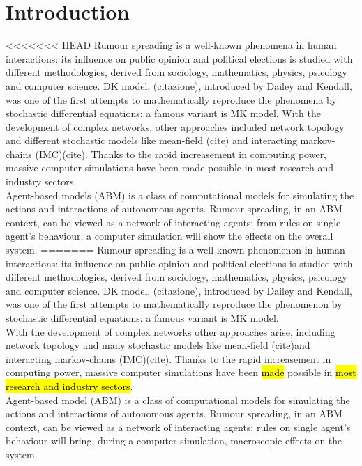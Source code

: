\section{Introduction}
<<<<<<< HEAD
Rumour spreading is a well-known phenomena in human interactions: its influence on public opinion and political elections is studied with different methodologies, derived from sociology, mathematics, physics, psicology and computer science.
DK model, (citazione), introduced by Dailey and Kendall, was one of the first attempts to mathematically reproduce the phenomena by stochastic differential equations: a famous variant is MK model.
With the development of complex networks, other approaches included network topology 
and different stochastic models like mean-field (cite) and interacting markov-chains (IMC)(cite).
Thanks to the rapid increasement in computing power, massive computer simulations have been made possible in most research and industry sectors.\\
Agent-based models (ABM) is a class of computational models for simulating the actions and interactions of autonomous agents.
Rumour spreading, in an ABM context, can be viewed as a network of interacting agents: from rules on single agent's behaviour,  a computer simulation will show the effects on the overall system.
=======
Rumour spreading is a well known phenomenon in human interactions:
its influence on public opinion and political elections is studied
with different methodologies, derived from sociology, mathematics,
physics, psicology and computer science.
DK model, (citazione), introduced by Dailey and Kendall, was one of
the first attempts to mathematically reproduce the phenomenon by
stochastic differential equations: a famous variant is MK model.\\
With the development of complex networks other approaches arise,
including network topology and many stochastic models
like mean-field (cite)and interacting markov-chains (IMC)(cite).
Thanks to the rapid increasement in computing power,
massive computer simulations have been \hl{made} possible in
\hl{most research and industry sectors}.\\
Agent-based model (ABM) is a class of computational models for
simulating the actions and interactions of autonomous agents.
Rumour spreading, in an ABM context, can be viewed as a network
of interacting agents: rules on single agent's behaviour
will bring, during a computer simulation, macroscopic
effects on the system.



